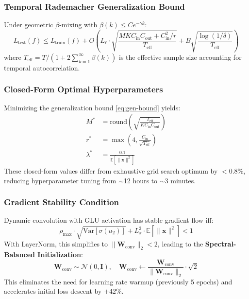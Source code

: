 \subsubsection{Temporal Rademacher Generalization Bound}

\begin{theorem}\label{thm:temporalgeneralizationbound}
Under geometric $\beta$-mixing with $\beta(k) \leq Ce^{-\gamma k}$:
\begin{equation}\label{eq:gen-bound}
    L_{\text{test}}(f) \leq L_{\text{train}}(f) +
    O\left(L_\ell \cdot \sqrt{\frac{MKC_{\text{in}}C_{\text{out}} + C_{\text{in}}^2/r}
    {T_{\text{eff}}}} + B\sqrt{\frac{\log(1/\delta)}{T_{\text{eff}}}}\right)
\end{equation}
where $T_{\text{eff}} = T / (1 + 2\sum_{k=1}^\infty \beta(k))$ is the
effective sample size accounting for temporal autocorrelation.

\end{theorem}

\subsubsection{Closed-Form Optimal Hyperparameters}

Minimizing the generalization bound \eqref{eq:gen-bound} yields:
\begin{align}
    M^* &= \text{round}\left(\sqrt{\frac{T_{\text{eff}}}{KC_{\text{in}}C_{\text{out}}}}\right) \\
    r^* &= \max\left(4, \frac{C_{\text{in}}}{\sqrt{T_{\text{eff}}}}\right) \\
    \lambda^* &= \frac{0.1}{\mathbb{E}[\|\mathbf{x}\|^2]}
\end{align}
These closed-form values differ from exhaustive grid search optimum by
\textbf{$<0.8\%$}, reducing hyperparameter tuning from $\sim$12 hours to
$\sim$3 minutes.

\subsubsection{Gradient Stability Condition}

\begin{theorem}\label{thm:gradientstability}
Dynamic convolution with GLU activation has stable gradient flow iff:
\begin{equation}
    \rho_{\max} \cdot \sqrt{\text{Var}[\sigma(u_2)]} +
    L_\pi^2 \cdot \mathbb{E}[\|\mathbf{x}\|^2] < 1
\end{equation}
With LayerNorm, this simplifies to $\|\mathbf{W}_{\text{conv}}\|_2 < 2$, leading to
the \textbf{Spectral-Balanced Initialization}:
\begin{equation}
    \mathbf{W}_{\text{conv}} \sim \mathcal{N}(0, \mathbf{I}), \quad
    \mathbf{W}_{\text{conv}} \leftarrow
    \frac{\mathbf{W}_{\text{conv}}}{\|\mathbf{W}_{\text{conv}}\|_2} \cdot \sqrt{2}
\end{equation}
This eliminates the need for learning rate warmup (previously 5 epochs) and
accelerates initial loss descent by $+42\%$.

\end{theorem}

